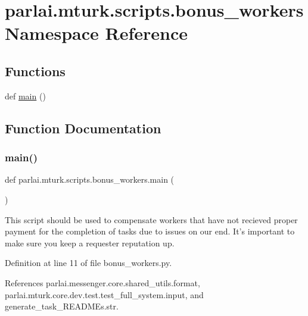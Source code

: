 \hypertarget{namespaceparlai_1_1mturk_1_1scripts_1_1bonus__workers}{}\section{parlai.\+mturk.\+scripts.\+bonus\+\_\+workers Namespace Reference}
\label{namespaceparlai_1_1mturk_1_1scripts_1_1bonus__workers}
\subsection*{Functions}
\begin{DoxyCompactItemize}
\item 
def \hyperlink{namespaceparlai_1_1mturk_1_1scripts_1_1bonus__workers_aafc7a350f4abb5524c1b7477b3fc2bda}{main} ()
\end{DoxyCompactItemize}


\subsection{Function Documentation}
\mbox{\label{namespaceparlai_1_1mturk_1_1scripts_1_1bonus__workers_aafc7a350f4abb5524c1b7477b3fc2bda}} 
\subsubsection{\texorpdfstring{main()}{main()}}
{\footnotesize\ttfamily def parlai.\+mturk.\+scripts.\+bonus\+\_\+workers.\+main (\begin{DoxyParamCaption}{ }\end{DoxyParamCaption})}

\begin{DoxyVerb}This script should be used to compensate workers that have not recieved
proper payment for the completion of tasks due to issues on our end.
It's important to make sure you keep a requester reputation up.
\end{DoxyVerb}
 

Definition at line 11 of file bonus\+\_\+workers.\+py.



References parlai.\+messenger.\+core.\+shared\+\_\+utils.\+format, parlai.\+mturk.\+core.\+dev.\+test.\+test\+\_\+full\+\_\+system.\+input, and generate\+\_\+task\+\_\+\+R\+E\+A\+D\+M\+Es.\+str.

